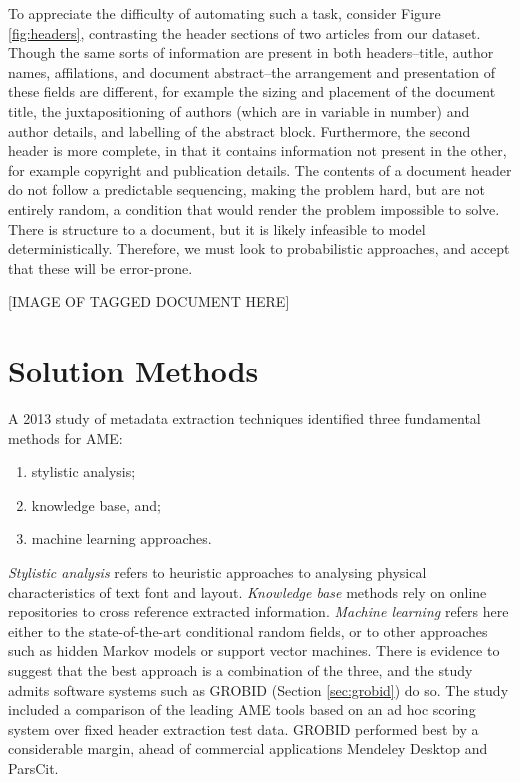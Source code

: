 To appreciate the difficulty of automating such a task, consider Figure \ref{fig:headers}, contrasting the header sections of two articles from our dataset. Though the same sorts of information are present in both headers--title, author names, affilations, and document abstract--the arrangement and presentation of these fields are different, for example the sizing and placement of the document title, the juxtapositioning of authors (which are in variable in number) and author details, and labelling of the abstract block. Furthermore, the second header is more complete, in that it contains information not present in the other, for example copyright and publication details. The contents of a document header do not follow a predictable sequencing, making the problem hard, but are not entirely random, a condition that would render the problem impossible to solve. There is structure to a document, but it is likely infeasible to model deterministically. Therefore, we must look to probabilistic approaches, and accept that these will be error-prone.

[IMAGE OF TAGGED DOCUMENT HERE]

\section{Solution Methods}

A 2013 study of metadata extraction techniques \cite{lipinski2013evaluation} identified three fundamental methods for AME:

\begin{enumerate}
\item stylistic analysis;
\item knowledge base, and;
\item machine learning approaches.
\end{enumerate}

\emph{Stylistic analysis} refers to heuristic approaches to analysing physical characteristics of text font and layout. \emph{Knowledge base} methods rely on online repositories to cross reference extracted information. \emph{Machine learning} refers here either to the state-of-the-art conditional random fields, or to other approaches such as hidden Markov models or support vector machines. There is evidence to suggest that the best approach is a combination of the three, and the study admits software systems such as GROBID (Section \ref{sec:grobid}) do so. The study included a comparison of the leading AME tools based on an ad hoc scoring system over fixed header extraction test data. GROBID  performed best by a considerable margin, ahead of commercial applications Mendeley Desktop and ParsCit.

